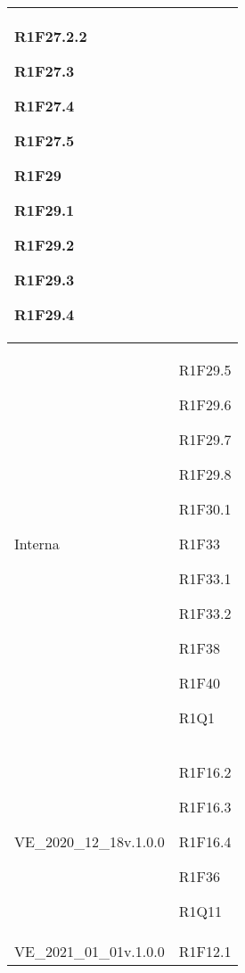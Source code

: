 \begin{center}
\begin{longtable}{|p{44mm}|p{22mm}|}
R1F27.2.2 \newline

R1F27.3 \newline

R1F27.4 \newline

R1F27.5 \newline

R1F29 \newline

R1F29.1 \newline

R1F29.2 \newline

R1F29.3 \newline

R1F29.4
\\
\hline
Interna &
R1F29.5 \newline

R1F29.6 \newline

R1F29.7 \newline

R1F29.8 \newline

R1F30.1 \newline

R1F33 \newline

R1F33.1 \newline

R1F33.2 \newline

R1F38 \newline

R1F40 \newline

 R1Q1 \newline
\\
\hline
VE\_2020\_12\_18v.1.0.0 &

R1F16.2 \newline

R1F16.3 \newline

R1F16.4 \newline

R1F36 \newline

R1Q11 \newline
\\
\hline
VE\_2021\_01\_01v.1.0.0 &

R1F12.1 \newline


\end{longtable}
\end{center}
